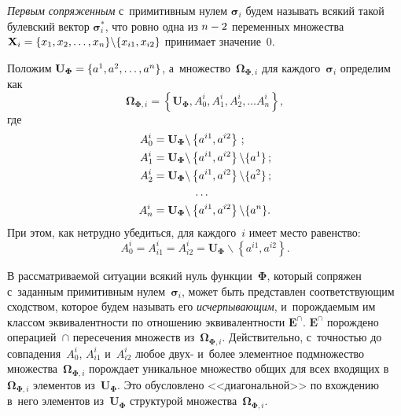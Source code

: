\begin{multicols}{2}
  \textit{Первым сопряженным} с~примитивным нулем $\boldsymbol{\sigma}_i$ 
будем называть всякий такой булевский вектор $\boldsymbol{\sigma}_i^*$, что 
ровно одна из $n\hm-2$ переменных множества $\mathbf{X}_i \hm= \{x_1, x_2, 
\ldots, x_n\} \backslash  \{x_{i1}, x_{i2}\}$ принимает значение~0. 
  
  Положим $\mathbf{U}_{{\boldsymbol{\Phi}}}\hm= \{a^1, a^2, \ldots, a^n\}$, 
а~множество~$\boldsymbol{\Omega}_{\mathbf{\Phi}, i}$ для 
каждого~$\boldsymbol{\sigma}_i$ определим как
  $$
\boldsymbol{\Omega}_{\mathbf{\Phi}, i} = \left\{\mathbf{U}_{\boldsymbol{\Phi}}, 
A^i_0, A_1^i, A_2^i,\ldots A_n^i\right\},
$$
где
\begin{align*}
A_0^i &= \mathbf{U}_{\boldsymbol{\Phi}}\backslash \left\{a^{i1}, a^{i2}\right\}\,;\\
A_1^i &= \mathbf{U}_{\boldsymbol{\Phi}}\backslash \left\{a^{i1}, a^{i2}\right\} 
\backslash \{a^1\}\,;\\
A_2^i &= \mathbf{U}_{\boldsymbol{\Phi}}\backslash \left\{a^{i1}, a^{i2}\right\} 
\backslash \{a^2\}\,;\\
&\hspace*{13mm}\ldots\\
A_n^i &= \mathbf{U}_{\boldsymbol{\Phi}}\backslash  \left\{a^{i1}, a^{i2}\right\} 
\backslash \{a^n\}.
\end{align*}
При этом, как нетрудно убедиться, для каждого~$i$ имеет место равенство: 
$$
A_0^i = A^i_{i1} = A^i_{i2} = \mathbf{U}_{\boldsymbol{\Phi}}\backslash  
\left\{a^{i1}, a^{i2}\right\}.
$$
  
  В рассматриваемой ситуации всякий нуль функции~$\boldsymbol{\Phi}$, 
который сопряжен с~заданным примитивным нулем~$\boldsymbol{\sigma}_i$, 
может быть представлен соответствующим сходством, которое будем называть 
его \textit{исчерпывающим}, и~порождаемым им классом эквивалентности по 
отношению эквивалентности $\mathbf{E}^{\cap}$. $\mathbf{E}^{\cap}$ 
порождено операцией~$\cap$ пересечения множеств 
из~$\boldsymbol{\Omega}_{\boldsymbol{\Phi}, i}$. Действительно, с~точностью до 
совпадения~$A_0^i$, $A^i_{i1}$ и~$A^i_{i2}$ любое двух- и~более элементное 
подмножество множества~$\boldsymbol{\Omega}_{\boldsymbol{\Phi}, i}$ 
порождает уникальное множество общих для всех входящих 
в~$\boldsymbol{\Omega}_{\boldsymbol{\Phi}, i}$ элементов 
из~$\mathbf{U}_{\boldsymbol{\Phi}}$. Это обусловлено <<диагональной>> по 
вхождению в~него элементов из~$\mathbf{U}_{\boldsymbol{\Phi}}$ структурой 
множества~$\boldsymbol{\Omega}_{\boldsymbol{\Phi}, i}$. 
  

\end{multicols}
